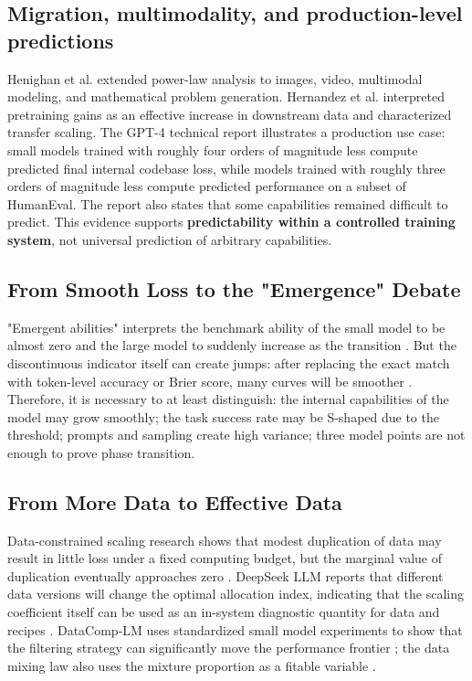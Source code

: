 \documentclass[UTF8,10pt,a4paper,fontset=none]{ctexart}
\newcommand{\term}[1]{\textbf{#1}}
\begin{document}
\subsection{Migration, multimodality, and production-level predictions}

Henighan et al. extended power-law analysis to images, video, multimodal modeling, and mathematical problem generation\cite{en:henighan2020}. Hernandez et al. interpreted pretraining gains as an effective increase in downstream data and characterized transfer scaling\cite{en:hernandez2021}. The GPT-4 technical report illustrates a production use case: small models trained with roughly four orders of magnitude less compute predicted final internal codebase loss, while models trained with roughly three orders of magnitude less compute predicted performance on a subset of HumanEval. The report also states that some capabilities remained difficult to predict\cite{en:openai2023gpt4}. This evidence supports \term{predictability within a controlled training system}, not universal prediction of arbitrary capabilities.

\subsection{From Smooth Loss to the "Emergence" Debate}

"Emergent abilities" interprets the benchmark ability of the small model to be almost zero and the large model to suddenly increase as the transition \cite{en:wei2022}. But the discontinuous indicator itself can create jumps: after replacing the exact match with token-level accuracy or Brier score, many curves will be smoother \cite{en:schaeffer2023}. Therefore, it is necessary to at least distinguish: the internal capabilities of the model may grow smoothly; the task success rate may be S-shaped due to the threshold; prompts and sampling create high variance; three model points are not enough to prove phase transition.

\subsection{From More Data to Effective Data}

Data-constrained scaling research shows that modest duplication of data may result in little loss under a fixed computing budget, but the marginal value of duplication eventually approaches zero \cite{en:muennighoff2023}. DeepSeek LLM reports that different data versions will change the optimal allocation index, indicating that the scaling coefficient itself can be used as an in-system diagnostic quantity for data and recipes \cite{en:deepseekllm2024}. DataComp-LM uses standardized small model experiments to show that the filtering strategy can significantly move the performance frontier \cite{en:datacomplm2024}; the data mixing law also uses the mixture proportion as a fitable variable \cite{en:datamixing2024}.
\end{document}
